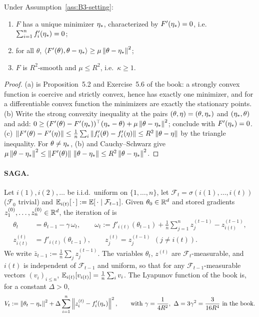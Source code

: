 \begin{lemma}\label{lem:B3-consequences}
Under Assumption~\ref{ass:B3-setting}:
\begin{enumerate}[label=(\alph*)]
\item $F$ has a unique minimizer $\eta_\ast$, characterized by $F'(\eta_\ast)=0$, i.e.\ $\sum_{i=1}^nf'_i(\eta_\ast)=0$;
\item for all $\theta$, $\left\langle F'(\theta), \theta-\eta_\ast \right\rangle\ge\mu\left\|\theta-\eta_\ast\right\|^2$;
\item $F$ is $R^2$-smooth and $\mu\le R^2$, i.e.\ $\kappa\ge 1$.
\end{enumerate}
\end{lemma}
\begin{proof}
(a) is Proposition~5.2 and Exercise~5.6 of the book: a strongly convex function is coercive and strictly convex, hence has exactly one minimizer, and for a differentiable convex function the minimizers are exactly the stationary points.
(b) Write the strong convexity inequality at the pairs $(\theta,\eta)=(\theta,\eta_\ast)$ and $(\eta_\ast,\theta)$ and add: $0\ge (F'(\theta)-F'(\eta_\ast))^\top(\eta_\ast-\theta)+\mu\left\|\theta-\eta_\ast\right\|^2$; conclude with $F'(\eta_\ast)=0$.
(c) $\left\|F'(\theta)-F'(\eta)\right\|\le\frac1n\sum_i\left\|f'_i(\theta)-f'_i(\eta)\right\|\le R^2\left\|\theta-\eta\right\|$ by the triangle inequality. For $\theta\ne\eta_\ast$, (b) and Cauchy--Schwarz give $\mu\left\|\theta-\eta_\ast\right\|^2\le\left\|F'(\theta)\right\|\,\left\|\theta-\eta_\ast\right\|\le R^2\left\|\theta-\eta_\ast\right\|^2$.
\end{proof}

\paragraph{SAGA.}
Let $i(1),i(2),\dots$ be i.i.d.\ uniform on $\{1,\dots,n\}$, let $\mathcal F_t=\sigma(i(1),\dots,i(t))$ ($\mathcal F_0$ trivial) and $\mathbb{E}_{i(t)}[\,\cdot\,]:=\mathbb{E}[\,\cdot\mid\mathcal F_{t-1}]$. Given $\theta_0\in\mathbb{R}^d$ and stored gradients $z^{(0)}_1,\dots,z^{(0)}_n\in\mathbb{R}^d$, the iteration of \cite[Sec.~5.4.4]{bach2024learning} is
\begin{equation}\label{eq:B3-saga}
\begin{aligned}
\theta_t&=\theta_{t-1}-\gamma\,\omega_t,\qquad
\omega_t:=f'_{i(t)}(\theta_{t-1})+\frac1n\sum_{j=1}^n z^{(t-1)}_j-z^{(t-1)}_{i(t)},\\
z^{(t)}_{i(t)}&=f'_{i(t)}(\theta_{t-1}),\qquad z^{(t)}_j=z^{(t-1)}_j\ \ (j\ne i(t)).
\end{aligned}
\end{equation}
We write $\bar z_{t-1}:=\frac1n\sum_j z^{(t-1)}_j$. The variables $\theta_t$, $z^{(t)}$ are $\mathcal F_t$-measurable, and $i(t)$ is independent of $\mathcal F_{t-1}$ and uniform, so that for any $\mathcal F_{t-1}$-measurable vectors $(v_i)_{i\le n}$, $\mathbb{E}_{i(t)}[v_{i(t)}]=\frac1n\sum_i v_i$. The Lyapunov function of the book is, for a constant $\Delta>0$,
\begin{equation}\label{eq:B3-lyapunov}
V_t:=\left\|\theta_t-\eta_\ast\right\|^2+\Delta\sum_{i=1}^n\left\|z^{(t)}_i-f'_i(\eta_\ast)\right\|^2,\qquad\text{with }\gamma=\frac{1}{4R^2},\ \Delta=3\gamma^2=\frac{3}{16R^4}\text{ in the book.}
\end{equation}

